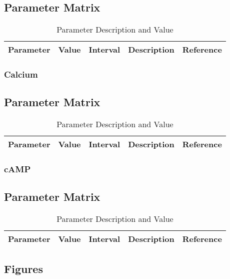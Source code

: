 \subsection{Parameter Matrix}
\vspace{4pt}
\centering
\begin{table}[H]\footnotesize
\caption{Parameter Description and Value}
\begin{tabular}{rllp{2cm}l}
	\hline	
	Parameter & Value & Interval & Description & Reference \\
	\hline 
\end{tabular}	
\end{table}

\subsubsection{Calcium} 

\subsection{Parameter Matrix}
\vspace{4pt}
\centering
\begin{table}[H]\footnotesize
\caption{Parameter Description and Value}
\begin{tabular}{rllp{2cm}l}
	\hline	
	Parameter & Value & Interval & Description & Reference \\
	\hline 
\end{tabular}	
\end{table}

\subsubsection{cAMP}

\subsection{Parameter Matrix}
\vspace{4pt}
\centering
\begin{table}[H]\footnotesize
\caption{Parameter Description and Value}
\begin{tabular}{rllp{2cm}l}
	\hline	
	Parameter & Value & Interval & Description & Reference \\
	\hline 
\end{tabular}	
\end{table}

\subsection{Figures}

